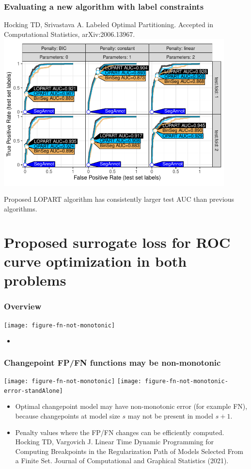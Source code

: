\documentclass[t]{beamer}
\begin{document}
\begin{frame}
  \frametitle{Evaluating a new algorithm with label constraints}
  {\scriptsize Hocking TD, Srivastava A. Labeled Optimal Partitioning. Accepted in Computational Statistics, arXiv:2006.13967.}
  \includegraphics[width=0.9\textwidth]{figure-LOPART-roc}

  Proposed LOPART algorithm has consistently larger test AUC than
  previous algorithms.
\end{frame}

\section{Proposed surrogate loss for ROC curve optimization in both problems}

\begin{frame}
  \frametitle{Overview}

  \texttt{[image: figure-fn-not-monotonic]}

\begin{itemize}
\item 
\end{itemize}
\end{frame}


\begin{frame}
  \frametitle{Changepoint FP/FN functions may be non-monotonic}

  \texttt{[image: figure-fn-not-monotonic]}
  \texttt{[image: figure-fn-not-monotonic-error-standAlone]}

\begin{itemize}
\item Optimal changepoint model may have non-monotonic error (for example
  FN), because changepoints at model size $s$ may not be present in
  model $s+1$.
\item Penalty values where the FP/FN changes can be efficiently
  computed. Hocking TD, Vargovich J. Linear Time Dynamic Programming
  for Computing Breakpoints in the Regularization Path of Models
  Selected From a Finite Set. Journal of Computational and Graphical
  Statistics (2021).
\end{itemize}
\end{frame}
\end{document}
